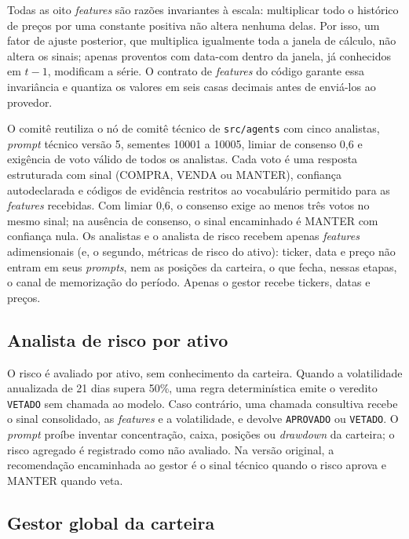 Todas as oito \textit{features} são razões invariantes à escala: multiplicar todo o histórico de preços por uma constante positiva não altera nenhuma delas. Por isso, um fator de ajuste posterior, que multiplica igualmente toda a janela de cálculo, não altera os sinais; apenas proventos com data-com dentro da janela, já conhecidos em $t-1$, modificam a série. O contrato de \textit{features} do código garante essa invariância e quantiza os valores em seis casas decimais antes de enviá-los ao provedor.

O comitê reutiliza o nó de comitê técnico de \texttt{src/agents} com cinco analistas, \textit{prompt} técnico versão 5, sementes 10001 a 10005, limiar de consenso 0,6 e exigência de voto válido de todos os analistas. Cada voto é uma resposta estruturada com sinal (COMPRA, VENDA ou MANTER), confiança autodeclarada e códigos de evidência restritos ao vocabulário permitido para as \textit{features} recebidas. Com limiar 0,6, o consenso exige ao menos três votos no mesmo sinal; na ausência de consenso, o sinal encaminhado é MANTER com confiança nula. Os analistas e o analista de risco recebem apenas \textit{features} adimensionais (e, o segundo, métricas de risco do ativo): ticker, data e preço não entram em seus \textit{prompts}, nem as posições da carteira, o que fecha, nessas etapas, o canal de memorização do período. Apenas o gestor recebe tickers, datas e preços.

\subsection{Analista de risco por ativo}

O risco é avaliado por ativo, sem conhecimento da carteira. Quando a volatilidade anualizada de 21 dias supera 50\%, uma regra determinística emite o veredito \texttt{VETADO} sem chamada ao modelo. Caso contrário, uma chamada consultiva recebe o sinal consolidado, as \textit{features} e a volatilidade, e devolve \texttt{APROVADO} ou \texttt{VETADO}. O \textit{prompt} proíbe inventar concentração, caixa, posições ou \textit{drawdown} da carteira; o risco agregado é registrado como não avaliado. Na versão original, a recomendação encaminhada ao gestor é o sinal técnico quando o risco aprova e MANTER quando veta.

\subsection{Gestor global da carteira}

